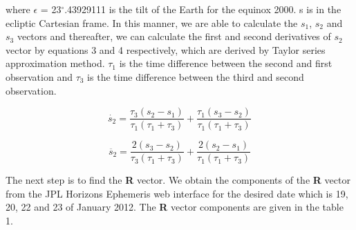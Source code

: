 \documentclass[letterpaper,12pt]{article}
\begin{document}
where \begin{math}\epsilon\end{math} = 23\begin{math} ^{\circ} \end{math}.43929111 is the tilt of the Earth for the equinox 2000. s is in the ecliptic Cartesian frame.
In this manner, we are able to calculate the \begin{math}s_{1}\end{math}, \begin{math}s_{2}\end{math} and \begin{math}s_{3}\end{math} vectors and thereafter, we can calculate the first and second derivatives of \begin{math} s_{2} \end{math} vector by equations 3 and 4 respectively, which are derived by Taylor series approximation method. \begin{math} \tau_{1} \end{math} is the time difference between the second and first observation and \begin{math} \tau_{3} \end{math} is the time difference between the third and second observation.


\begin{equation}
\dot{s_{2}}=\frac{\tau_{3}(s_{2}-s_{1})}{\tau_{1}(\tau_{1}+\tau_{3})}+\frac{\tau_{1}(s_{3}-s_{2})}{\tau_{1}(\tau_{1}+\tau_{3})}
\end{equation}


\begin{equation}
\ddot{s_{2}}=\frac{2(s_{3}-s_{2})}{\tau_{3}(\tau_{1}+\tau_{3})}+\frac{2(s_{2}-s_{1})}{\tau_{1}(\tau_{1}+\tau_{3})}
\end{equation}

The next step is to find the {\bf R} vector. We obtain the components of the {\bf R} vector from the JPL Horizons Ephemeris web interface for the desired date which is 19, 20, 22 and 23 of January 2012.
The {\bf R} vector components are given in the table 1.
\end{document}
